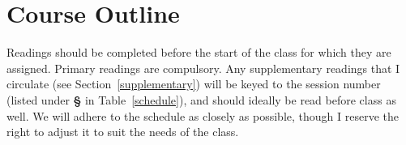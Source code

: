 \documentclass[titlepage]{article}
\newcommand\policy{../policy}
\begin{document}






\section{Course Outline}
\label{outline}

Readings should be completed before the start of the class for which
they are assigned. Primary readings are compulsory. Any supplementary
readings that I circulate (see Section~\ref{supplementary}) will be
keyed to the session number (listed under \textbf{\S} in
Table~\ref{schedule}), and should ideally be read before class as well.
We will adhere to the schedule as closely as possible, though I reserve
the right to adjust it to suit the needs of the class.

\newcommand\Yhwh{\textsc{Yhwh}}
\newcommand\rarr{\char"2192\hspace*{0.5pt}}
\end{document}

